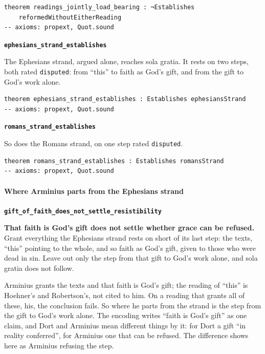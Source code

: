 \documentclass[11pt]{article}
\begin{document}
{\small\begin{verbatim}
theorem readings_jointly_load_bearing : ¬Establishes
    reformedWithoutEitherReading
-- axioms: propext, Quot.sound
\end{verbatim}}
\par\medskip\noindent\textbf{\texttt{ephesians\_\allowbreak{}strand\_\allowbreak{}establishes}}\par\nobreak\noindent
The Ephesians strand, argued alone, reaches sola gratia. It rests on two steps, both rated \texttt{disputed}: from “this” to faith as God’s gift, and from the gift to God’s work alone.

{\small\begin{verbatim}
theorem ephesians_strand_establishes : Establishes ephesiansStrand
-- axioms: propext, Quot.sound
\end{verbatim}}
\par\medskip\noindent\textbf{\texttt{romans\_\allowbreak{}strand\_\allowbreak{}establishes}}\par\nobreak\noindent
So does the Romans strand, on one step rated \texttt{disputed}.

{\small\begin{verbatim}
theorem romans_strand_establishes : Establishes romansStrand
-- axioms: propext, Quot.sound
\end{verbatim}}
\paragraph*{Where Arminius parts from the Ephesians strand}
\leavevmode\par\nobreak
\par\medskip\noindent\textbf{\texttt{gift\_\allowbreak{}of\_\allowbreak{}faith\_\allowbreak{}does\_\allowbreak{}not\_\allowbreak{}settle\_\allowbreak{}resistibility}}\par\nobreak\noindent
\textbf{That faith is God’s gift does not settle whether grace can be refused.} Grant everything the Ephesians strand rests on short of its last step: the texts, “this” pointing to the whole, and so faith as God’s gift, given to those who were dead in sin. Leave out only the step from that gift to God’s work alone, and sola gratia does not follow.

Arminius grants the texts and that faith is God’s gift; the reading of “this” is Hoehner’s and Robertson’s, not cited to him. On a reading that grants all of these, his, the conclusion fails. So where he parts from the strand is the step from the gift to God’s work alone. The encoding writes “faith is God’s gift” as one claim, and Dort and Arminius mean different things by it: for Dort a gift “in reality conferred”, for Arminius one that can be refused. The difference shows here as Arminius refusing the step.
\end{document}
